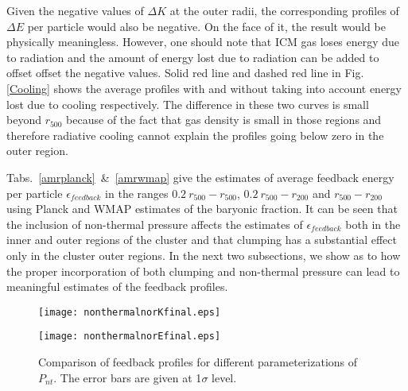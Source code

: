 \documentclass[a4paper,fleqn,usenatbib]{mnras}
\begin{document}
Given the negative values of $\Delta K$ at the outer radii,  the corresponding profiles of $\Delta E$ per particle would also be negative. 
On the face of it, the result would be physically meaningless. However, one should note that ICM gas loses energy due to radiation and the amount of energy lost due to radiation can be added to offset offset the negative values. Solid red line and dashed red line in Fig.~ \ref{Cooling} 
shows the average profiles with and without taking into account energy lost due to cooling respectively. The difference in these two curves  is small beyond $r_{500}$ because of the fact that gas density is small in those regions and therefore radiative cooling cannot explain the profiles going below zero in the  outer region.  

Tabs.~\ref{amrplanck}~\&~\ref{amrwmap} give the estimates of average feedback energy per particle $\epsilon_{feedback}$ in the ranges $0.2~r_{500}-r_{500}$, $0.2~r_{500}-r_{200}$ and $r_{500}-r_{200}$ using  Planck and  WMAP estimates of the baryonic fraction. 
It can be seen that the inclusion of non-thermal pressure affects the estimates of $\epsilon_{feedback}$ both in the inner and outer regions of the cluster and that clumping has a substantial effect only in the cluster outer regions. In the next two subsections, we show as to how the proper incorporation of both clumping and non-thermal pressure can lead to meaningful estimates of the feedback profiles.
\begin{figure*}
\begin{minipage}{8.5cm}
 \texttt{[image: nonthermalnorKfinal.eps]}
\end{minipage}
\begin{minipage}{8.5cm}
 \texttt{[image: nonthermalnorEfinal.eps]}
\end{minipage}   
\caption{Comparison of feedback profiles for different parameterizations of $P_{nt}$. The error bars are given at  1$\sigma$ level.}
\label{nonthermalnor}
\end{figure*}
\end{document}
